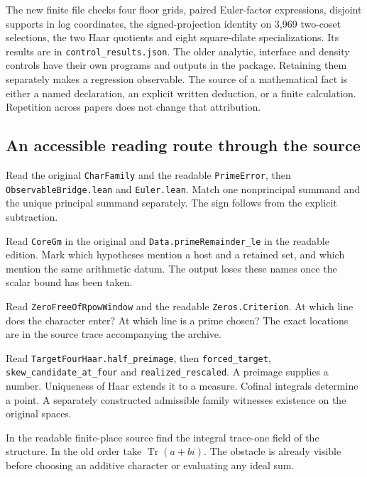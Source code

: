 \documentclass[12pt,letterpaper]{article}
\newcommand{\id}[1]{{\small\nolinkurl{#1}}}
\begin{document}
The new finite file checks four floor grids, paired Euler-factor expressions, disjoint supports in log coordinates, the signed-projection identity on 3,969 two-coset selections, the two Haar quotients and eight square-dilate specializations. Its results are in \id{control_results.json}. The older analytic, interface and density controls have their own programs and outputs in the package. Retaining them separately makes a regression observable. The source of a mathematical fact is either a named declaration, an explicit written deduction, or a finite calculation. Repetition across papers does not change that attribution.

\subsection{An accessible reading route through the source}
\begin{description}[style=nextline,leftmargin=1.5em]
\item[Start with the common scalar.] Read the original \id{CharFamily} and the readable \id{PrimeError}, then \id{ObservableBridge.lean} and \id{Euler.lean}. Match one nonprincipal summand and the unique principal summand separately. The sign follows from the explicit subtraction.
\item[Follow a single scale.] Read \id{CoreGm} in the original and \id{Data.primeRemainder_le} in the readable edition. Mark which hypotheses mention a host and a retained set, and which mention the same arithmetic datum. The output loses these names once the scalar bound has been taken.
\item[Follow a possible zero.] Read \id{ZeroFreeOfRpowWindow} and the readable \id{Zeros.Criterion}. At which line does the character enter? At which line is a prime chosen? The exact locations are in the source trace accompanying the archive.
\item[Follow the unit of volume.] Read \id{TargetFourHaar.half_preimage}, then \id{forced_target}, \id{skew_candidate_at_four} and \id{realized_rescaled}. A preimage supplies a number. Uniqueness of Haar extends it to a measure. Cofinal integrals determine a point. A separately constructed admissible family witnesses existence on the original spaces.
\item[Inspect the unresolved premise.] In the readable finite-place source find the integral trace-one field of the structure. In the old order take $\operatorname{Tr}(a+bi)$. The obstacle is already visible before choosing an additive character or evaluating any ideal sum.
\end{description}
\end{document}
